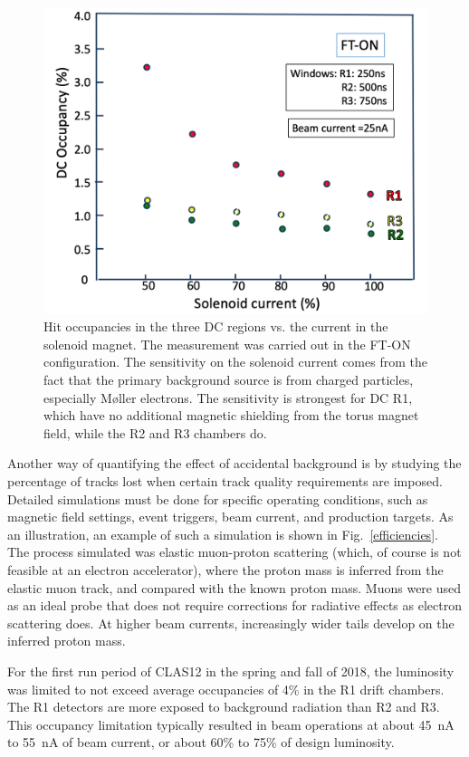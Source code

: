\documentclass[final,3p]{elsarticle}
\begin{document}
\begin{twocolumn}
\begin{figure}[t!]
\centerline{\includegraphics[width=1.0\columnwidth]{occupancy-solenoid.png}}
\caption{Hit occupancies in the three DC regions vs. the current in the solenoid magnet. The measurement was carried
  out in the FT-ON configuration. The sensitivity on the solenoid current comes from the fact that the primary
  background source is from charged particles, especially M{\o}ller electrons. The sensitivity is strongest for DC R1,
  which have no additional magnetic shielding from the torus magnet field, while the R2 and R3 chambers do.}
\label{occupancies2}
\end{figure}

Another way of quantifying the effect of accidental background is by studying the percentage of tracks lost when
certain track quality requirements are imposed. Detailed simulations must be done for specific operating conditions,
such as magnetic field settings, event triggers, beam current, and production targets. As an illustration, an example of
such a simulation is shown in Fig.~\ref{efficiencies}. The process simulated was elastic muon-proton scattering (which,
of course is not feasible at an electron accelerator), where the proton mass is inferred from the elastic muon track, and
compared with the known proton mass. Muons were used as an ideal probe that does not require corrections for radiative
effects as electron scattering does. At higher beam currents, increasingly wider tails develop on the inferred proton
mass. 

For the first run period of CLAS12 in the spring and fall of 2018, the luminosity was limited to not exceed average
occupancies of 4\% in the R1 drift chambers. The R1 detectors are more exposed to background radiation than R2 and
R3. This occupancy limitation typically resulted in beam operations at about 45~nA to 55~nA of beam current, or about
60\% to 75\% of design luminosity.


\end{twocolumn}
\end{document}
